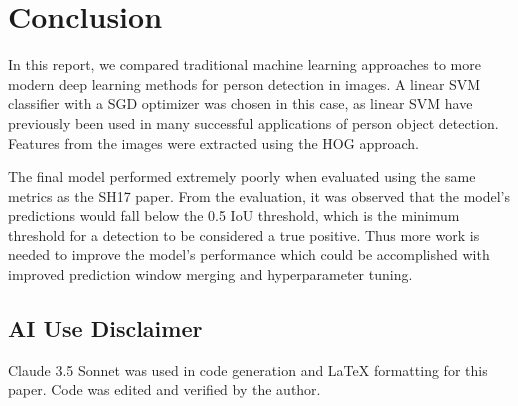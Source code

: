 \section{Conclusion}

In this report, we compared traditional machine learning approaches to more modern deep learning methods for person detection in images.
A linear SVM classifier with a SGD optimizer was chosen in this case, as linear SVM have previously been used in many successful applications of person object detection.
Features from the images were extracted using the HOG approach.

The final model performed extremely poorly when evaluated using the same metrics as the SH17 paper.
From the evaluation, it was observed that the model's predictions would fall below the 0.5 IoU threshold, which is the minimum threshold for a detection to be considered a true positive.
Thus more work is needed to improve the model's performance which could be accomplished with improved prediction window merging and hyperparameter tuning.

\subsection{AI Use Disclaimer}
Claude 3.5 Sonnet was used in code generation and \LaTeX{} formatting for this paper. Code was edited and verified by the author.